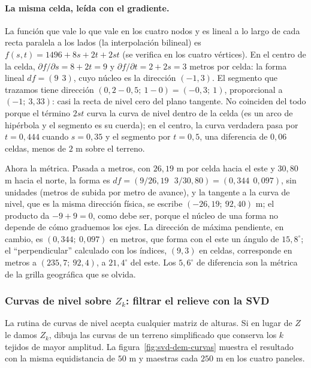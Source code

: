 \paragraph{La misma celda, leída con el gradiente.} La función que vale lo que vale en los
cuatro nodos y es lineal a lo largo de cada recta paralela a los lados (la interpolación
bilineal) es
\(f(s,t)=1496+8s+2t+2st\) (se verifica en los cuatro vértices). En el centro de la celda,
\(\partial f/\partial s=8+2t=9\) y \(\partial f/\partial t=2+2s=3\) metros por celda: la
forma lineal \(df=(9\ \ 3)\), cuyo núcleo es la dirección \((-1,3)\). El segmento que
trazamos tiene dirección \((0{,}2-0{,}5;\ 1-0)=(-0{,}3;\ 1)\), proporcional a
\((-1;\ 3{,}33)\): casi la recta de nivel cero del plano tangente. No coinciden del todo
porque el término \(2st\) curva la curva de nivel dentro de la celda (es un arco de hipérbola
y el segmento es su cuerda); en el centro, la curva verdadera pasa por \(t=0{,}444\) cuando
\(s=0{,}35\) y el segmento por \(t=0{,}5\), una diferencia de \(0{,}06\) celdas, menos de
\(2\) m sobre el terreno.

Ahora la métrica. Pasada a metros, con \(26{,}19\) m por celda hacia el este y \(30{,}80\) m
hacia el norte, la forma es \(df=(9/26{,}19\ \ \ 3/30{,}80)=(0{,}344\ \ 0{,}097)\), sin
unidades (metros de subida por metro de avance), y la tangente a la curva de nivel, que es
la misma dirección física, se escribe \((-26{,}19;\ 92{,}40)\) m; el producto da \(-9+9=0\), como
debe ser, porque el núcleo de una forma no depende de cómo graduemos los ejes. La dirección de
máxima pendiente, en cambio, es \((0{,}344;\ 0{,}097)\) en metros, que forma con el este un
ángulo de \(15{,}8^\circ\); el ``perpendicular'' calculado con los índices, \((9,3)\) en celdas,
corresponde en metros a \((235{,}7;\ 92{,}4)\), a \(21{,}4^\circ\) del este. Los
\(5{,}6^\circ\) de diferencia son la métrica de la grilla geográfica que se olvida.

\subsubsection{Curvas de nivel sobre \texorpdfstring{$Z_k$}{Zk}: filtrar el relieve con la SVD}\label{sec:svd-dem-filtro}

La rutina de curvas de nivel acepta cualquier matriz de alturas. Si en lugar de \(Z\) le damos
\(Z_k\), dibuja las curvas de un terreno simplificado que conserva los \(k\) tejidos de mayor
amplitud. La figura~\ref{fig:svd-dem-curvas} muestra el resultado con la misma equidistancia
de \(50\) m y maestras cada \(250\) m en los cuatro paneles.

